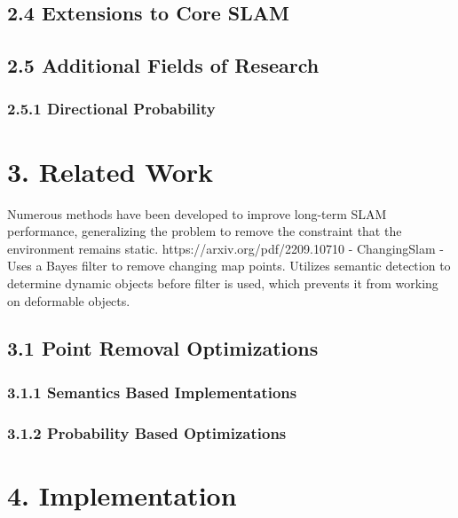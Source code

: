 \documentclass[12pt]{article}
\begin{document}
\subsection{2.4 Extensions to Core SLAM}

\subsection{2.5 Additional Fields of Research}

\subsubsection{2.5.1 Directional Probability}

\section{3. Related Work}

Numerous methods have been developed to improve long-term SLAM performance, generalizing the problem to remove the constraint that the environment remains static.
https://arxiv.org/pdf/2209.10710 - ChangingSlam - Uses a Bayes filter to remove changing map points. Utilizes semantic detection to determine dynamic objects before filter is used, which prevents it from working on deformable objects.

\subsection{3.1 Point Removal Optimizations}

\subsubsection{3.1.1 Semantics Based Implementations}

\subsubsection{3.1.2 Probability Based Optimizations}

\section{4. Implementation}
\end{document}
